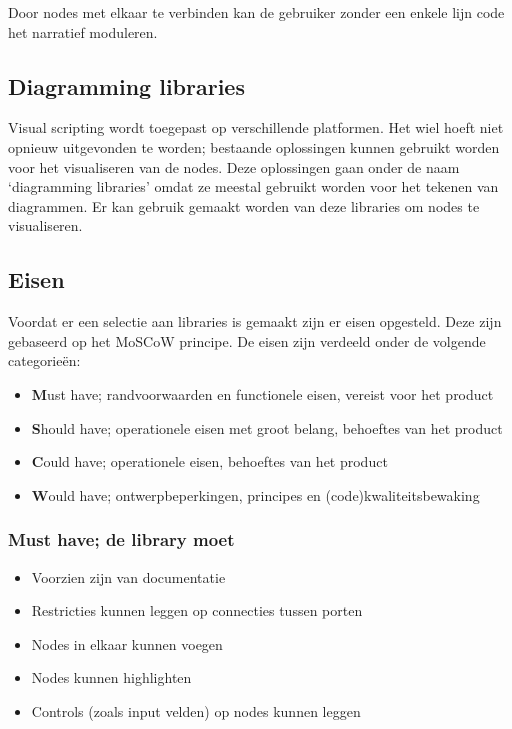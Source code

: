 Door nodes met elkaar te verbinden kan de gebruiker zonder een enkele lijn code het narratief moduleren.

\subsection{Diagramming libraries}
Visual scripting wordt toegepast op verschillende platformen\cite{UnityAssetStoreVisualScripting}\cite{NoFlo}\cite{GitHub3dVisualScripting}. Het wiel hoeft niet opnieuw uitgevonden te worden; bestaande oplossingen kunnen gebruikt worden voor het visualiseren van de nodes. Deze oplossingen gaan onder de naam ‘diagramming libraries’ omdat ze meestal gebruikt worden voor het tekenen van diagrammen. Er kan gebruik gemaakt worden van deze libraries om nodes te visualiseren.

\subsection{Eisen}
Voordat er een selectie aan libraries is gemaakt zijn er eisen opgesteld. Deze zijn gebaseerd op het MoSCoW principe. De eisen zijn verdeeld onder de volgende categorieën:

\begin{itemize}
    \item \textbf{M}ust have; randvoorwaarden en functionele eisen, vereist voor het product
    \item \textbf{S}hould have; operationele eisen met groot belang, behoeftes van het product
    \item \textbf{C}ould have; operationele eisen, behoeftes van het product
    \item \textbf{W}ould have; ontwerpbeperkingen, principes en (code)kwaliteitsbewaking
\end{itemize}

\subsubsection{Must have; de library moet}
\begin{itemize}
    \item Voorzien zijn van documentatie
    \item Restricties kunnen leggen op connecties tussen porten
    \item Nodes in elkaar kunnen voegen
    \item Nodes kunnen highlighten
    \item Controls (zoals input velden) op nodes kunnen leggen
\end{itemize}

